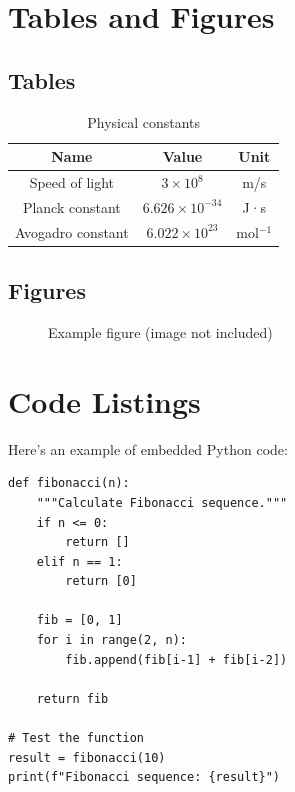 \documentclass[12pt,a4paper]{article}
\theoremstyle{definition}
\theoremstyle{remark}
\begin{document}
\section{Tables and Figures}

\subsection{Tables}

\begin{table}[h]
\centering
\begin{tabular}{|c|c|c|}
\hline
\textbf{Name} & \textbf{Value} & \textbf{Unit} \\
\hline
Speed of light & $3 \times 10^8$ & m/s \\
Planck constant & $6.626 \times 10^{-34}$ & J·s \\
Avogadro constant & $6.022 \times 10^{23}$ & mol$^{-1}$ \\
\hline
\end{tabular}
\caption{Physical constants}
\label{tab:constants}
\end{table}

\subsection{Figures}

\begin{figure}[h]
\centering
\caption{Example figure (image not included)}
\label{fig:example}
\end{figure}

\section{Code Listings}

Here's an example of embedded Python code:

\begin{lstlisting}[caption={Python Fibonacci Implementation}]
def fibonacci(n):
    """Calculate Fibonacci sequence."""
    if n <= 0:
        return []
    elif n == 1:
        return [0]
    
    fib = [0, 1]
    for i in range(2, n):
        fib.append(fib[i-1] + fib[i-2])
    
    return fib

# Test the function
result = fibonacci(10)
print(f"Fibonacci sequence: {result}")
\end{lstlisting}
\end{document}
